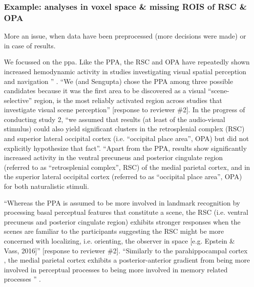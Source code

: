 
\subsubsection{Example: analyses in voxel space \&  missing ROIS of RSC \& OPA}

More an issue, when data have been preprocessed (more decisions were made) or in
case of results.

We focussed on the \ac{ppa}.
%
Like the PPA, the RSC and OPA have repeatedly shown increased hemodynamic
activity in studies investigating visual spatial perception and navigation
\citep{chrastil2018heterogeneity, bettencourt2013role, dilks2013occipital,
epstein2019scene}'' \citep{haeusler2022processing}.
%
``We (and Sengupta) chose the PPA among three possible candidates
because it was the first area to be discovered as a visual ``scene-selective''
region, is the most reliably activated region across studies that investigate
visual scene perception'' [response to reviewer \#2].
%
In the progress of conducting study 2, ``we assumed that results (at least of
the audio-visual stimulus) could also yield significant clusters in the
retrosplenial complex (RSC) and superior lateral occipital cortex (i.e.
“occipital place area”, OPA) but did not explicitly hypothesize that fact''.
%
``Apart from the PPA, results show significantly increased activity in the
ventral precuneus and posterior cingulate region (referred to as ``retrosplenial
complex'', RSC) of the medial parietal cortex, and in the superior lateral
occipital cortex (referred to as ``occipital place area'', OPA) for both
naturalistic stimuli.

%
``Whereas the PPA is assumed to be more involved in landmark recognition by
processing basal perceptual features that constitute a scene, the RSC (i.e.
ventral precuneus and posterior cingulate region) exhibits stronger responses
when the scenes are familiar to the participants suggesting the RSC might be
more concerned with localizing, i.e. orienting, the observer in space [e.g.
Epstein \& Vass, 2016]'' [response to reviewer \#2].
``Similarly to the parahippocampal cortex \citep{aminoff2013role}, the medial
parietal cortex exhibits a posterior-anterior gradient from being more involved
in perceptual processes to being more involved in memory related processes
\citep{chrastil2018heterogeneity, hassabis2009construction, silson2019posterior,
steel2021network}'' \citep{haeusler2022processing}.


